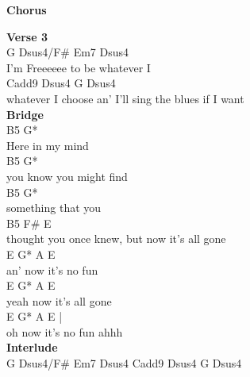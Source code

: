 \documentclass[a4paper]{article}
\begin{document}
{{        }
        \textbf{Chorus}
        ~\\
        {
            \cutive
            \obeyspaces

        }
        \textbf{Verse 3}
        ~\\
        {
            \cutive
            \obeyspaces
   G    Dsus4/F\#       Em7     Dsus4
\\
I'm Freeeeee  to be whatever I
\\
    Cadd9             Dsus4                 G       Dsus4
\\
whatever I choose an' I'll sing the blues if I want
\\

        }
        \textbf{Bridge}
        ~\\
        {
            \cutive
            \obeyspaces
B5              G*
\\
    Here in my mind
\\
B5                      G*
\\
    you know you might find
\\
B5                  G*
\\
    something that you
\\
B5                   F\#                       E
\\
    thought you once knew, but now it's all gone
\\
E   G*       A   E
\\
an' now it's no fun
\\
E    G*       A    E
\\
yeah now it's all gone
\\
E  G*       A   E  | %
\\
oh now it's no fun        ahhh
\\

        }
        \textbf{Interlude}
        ~\\
        {
            \cutive
            \obeyspaces
G   Dsus4/F\#  Em7  Dsus4  Cadd9  Dsus4  G   Dsus4
\\

}}
\end{document}
